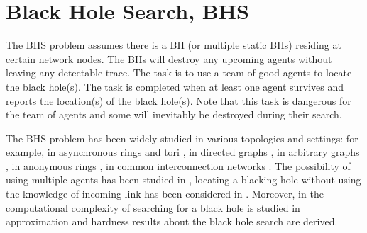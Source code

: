 \section{Black Hole Search, BHS}
The BHS problem assumes there is a BH (or multiple static BHs) residing at certain network nodes. The BHs will destroy any upcoming agents without leaving any detectable trace. The task is to use a team of good agents to locate the black hole(s). The task is completed when at least one agent survives and reports the location(s) of the black hole(s). Note that this task is dangerous for the team of agents and some will inevitably  be destroyed during their search.  

The BHS problem has been widely studied in various topologies and settings: 
for example,  in asynchronous rings and tori  \cite{das1,das2}, in directed graphs \cite{czyz},  in arbitrary graphs  \cite{dobr},  in anonymous rings  \cite{dobr3},  in common interconnection networks   \cite{dobr2}.
 The possibility of using multiple agents has been studied in  \cite{coop}, 
  locating a blacking hole without using the knowledge of incoming link has been considered in  \cite{glau}.
Moreover,  in  \cite{czyz1}   the computational complexity of searching for a black hole is studied
 in   \cite{klas,klas1}     approximation   and hardness results about the black hole search are derived.

